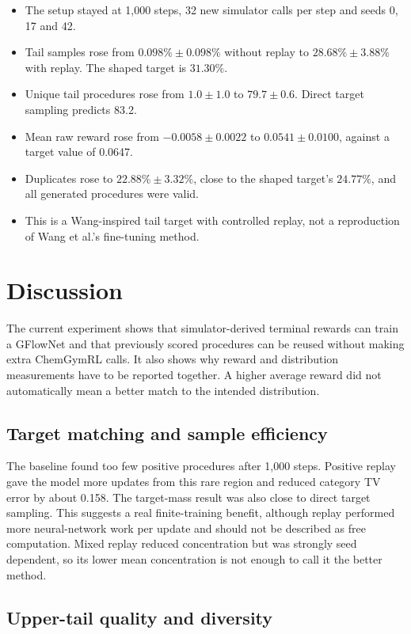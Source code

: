 \documentclass{article}
\begin{document}
\begin{itemize}
    \item The setup stayed at 1,000 steps, 32 new simulator calls per step and seeds 0, 17 and 42.
    \item Tail samples rose from $0.098\%\pm0.098\%$ without replay to $28.68\%\pm3.88\%$ with replay. The shaped target is $31.30\%$.
    \item Unique tail procedures rose from $1.0\pm1.0$ to $79.7\pm0.6$. Direct target sampling predicts 83.2.
    \item Mean raw reward rose from $-0.0058\pm0.0022$ to $0.0541\pm0.0100$, against a target value of 0.0647.
    \item Duplicates rose to $22.88\%\pm3.32\%$, close to the shaped target's $24.77\%$, and all generated procedures were valid.
    \item This is a Wang-inspired tail target with controlled replay, not a reproduction of Wang et al.'s fine-tuning method.
\end{itemize}

\section{Discussion}

The current experiment shows that simulator-derived terminal rewards can train a GFlowNet and that previously scored procedures can be reused without making extra ChemGymRL calls. It also shows why reward and distribution measurements have to be reported together. A higher average reward did not automatically mean a better match to the intended distribution.

\subsection{Target matching and sample efficiency}

The baseline found too few positive procedures after 1,000 steps. Positive replay gave the model more updates from this rare region and reduced category TV error by about 0.158. The target-mass result was also close to direct target sampling. This suggests a real finite-training benefit, although replay performed more neural-network work per update and should not be described as free computation. Mixed replay reduced concentration but was strongly seed dependent, so its lower mean concentration is not enough to call it the better method.

\subsection{Upper-tail quality and diversity}
\end{document}
